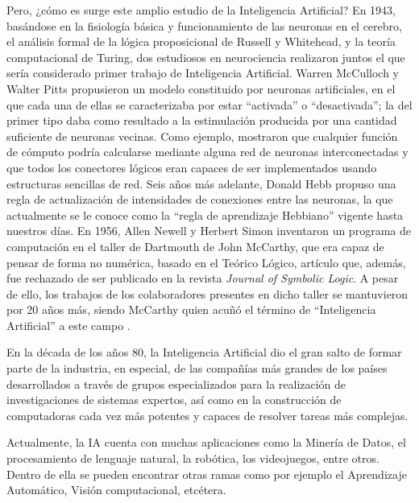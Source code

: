 Pero, ¿cómo es surge este amplio estudio de la Inteligencia Artificial? En 1943, basándose en la fisiología básica y funcionamiento de las neuronas en el cerebro, el análisis formal de la lógica proposicional de Russell y Whitehead, y la teoría computacional de Turing, dos estudiosos en neurociencia realizaron juntos el que sería considerado primer trabajo de Inteligencia Artificial. Warren McCulloch y Walter Pitts propusieron un modelo constituido por neuronas artificiales, en el que cada una de ellas se caracterizaba por estar “activada” o “desactivada”; la del primer tipo daba como resultado a la estimulación producida por una cantidad suficiente de neuronas vecinas. Como ejemplo, mostraron que cualquier función de cómputo podría calcularse mediante alguna red de neuronas interconectadas y que todos los conectores lógicos eran capaces de ser implementados usando estructuras sencillas de red. Seis años más adelante, Donald Hebb propuso una regla de actualización de intensidades de conexiones entre las neuronas, la que actualmente se le conoce como la “regla de aprendizaje Hebbiano” vigente hasta nuestros días. En 1956, Allen Newell y Herbert Simon inventaron un programa de computación en el taller de Dartmouth de John McCarthy, que era capaz de pensar de forma no numérica, basado en el Teórico Lógico, artículo que, además, fue rechazado de ser publicado en la revista \textit{Journal of Symbolic Logic}. A pesar de ello, los trabajos de los colaboradores presentes en dicho taller se mantuvieron por 20 años más, siendo McCarthy quien acuñó el término de “Inteligencia Artificial” a este campo \parencite{bk_russell2004intart}.

En la década de los años 80, la Inteligencia Artificial dio el gran salto de formar parte de la industria, en especial, de las compañías más grandes de los países desarrollados a través de grupos especializados para la realización de investigaciones de sistemas expertos, así como en la construcción de computadoras cada vez más potentes y capaces de resolver tareas más complejas.

Actualmente, la IA cuenta con muchas aplicaciones como la Minería de Datos, el procesamiento de lenguaje natural, la robótica, los videojuegos, entre otros. Dentro de ella se pueden encontrar otras ramas como por ejemplo el Aprendizaje Automático, Visión computacional, etcétera.

